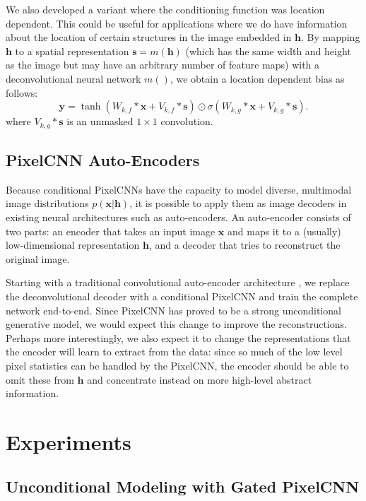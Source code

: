 \documentclass{article}
\renewcommand{\vec}{\mathbf}
\begin{document}
We also developed a variant where the conditioning function was location dependent. This could be useful for applications where we do have information about the location of certain structures in the image embedded in $\vec{h}$. By mapping $\vec{h}$ to a spatial representation $\vec{s}=m\left(\vec{h}\right)$ (which has the same width and height as the image but may have an arbitrary number of feature maps) with a deconvolutional neural network $m()$, we obtain a location dependent bias as follows:
\begin{equation}
\vec{y} = \tanh (W_{k,f} \ast \vec{x} + V_{k, f} \ast \vec{s}) \odot  \sigma(W_{k,g} \ast \vec{x} + V_{k, g} \ast \vec{s}). \label{spatially_biased_activation}
\end{equation}
where $V_{k, g} \ast \vec{s}$ is an unmasked $1 \times 1$ convolution.

\subsection{PixelCNN Auto-Encoders}
\label{sec:ae}

Because conditional PixelCNNs have the capacity to model diverse, multimodal image distributions $p(\vec{x}|\vec{h})$, it is possible to apply them as image decoders in existing neural architectures such as auto-encoders. An auto-encoder consists of two parts: an encoder that takes an input image $\vec{x}$ and maps it to a (usually) low-dimensional representation $\vec{h}$, and a decoder that tries to reconstruct the original image.

Starting with a traditional convolutional auto-encoder architecture \cite{masci2011stacked}, we replace the deconvolutional decoder with a conditional PixelCNN and train the complete network end-to-end.
Since PixelCNN has proved to be a strong unconditional generative model, we would expect this change to improve the reconstructions.
Perhaps more interestingly, we also expect it to change the representations that the encoder will learn to extract from the data: since so much of the low level pixel statistics can be handled by the PixelCNN, the encoder should be able to omit these from $\vec{h}$ and concentrate instead on more high-level abstract information.
 \section{Experiments}

\subsection{Unconditional Modeling with Gated PixelCNN}
\end{document}
